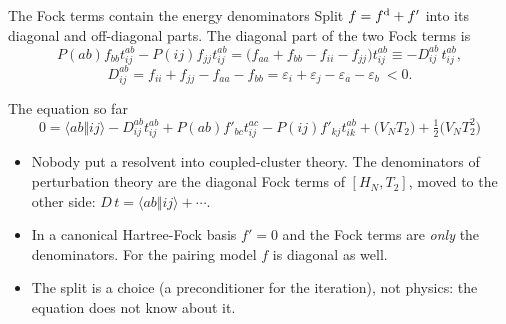 \documentclass[aspectratio=169,10pt]{beamer}
\newcommand{\as}[4]{\langle #1#2\Vert #3#4\rangle}
\begin{document}
\begin{frame}[shrink=7]{The Fock terms contain the energy denominators}
Split $f=f^{\rm d}+f'$ into its diagonal and off-diagonal parts. The diagonal part of the two Fock terms is
\[
 P(ab)f_{bb}t_{ij}^{ab}-P(ij)f_{jj}t_{ij}^{ab}
 =\bigl(f_{aa}+f_{bb}-f_{ii}-f_{jj}\bigr)t_{ij}^{ab}\equiv-D_{ij}^{ab}\,t_{ij}^{ab},
\]
\[
 D_{ij}^{ab}=f_{ii}+f_{jj}-f_{aa}-f_{bb}=\varepsilon_i+\varepsilon_j-\varepsilon_a-\varepsilon_b\ <0 .
\]
\begin{block}{The equation so far}
\[
 0=\as abij-D_{ij}^{ab}t_{ij}^{ab}+P(ab)f'_{bc}t_{ij}^{ac}-P(ij)f'_{kj}t_{ik}^{ab}+\bigl(V_NT_2\bigr)+\tfrac12\bigl(V_NT_2^2\bigr)
\]
\end{block}
\begin{itemize}
\item Nobody put a resolvent into coupled-cluster theory. The denominators of perturbation theory are the diagonal Fock terms of $[H_N,T_2]$, moved to the other side: $D\,t=\as abij+\cdots$.
\item In a canonical Hartree-Fock basis $f'=0$ and the Fock terms are \emph{only} the denominators. For the pairing model $f$ is diagonal as well.
\item The split is a choice (a preconditioner for the iteration), not physics: the equation does not know about it.
\end{itemize}
\end{frame}
\end{document}
